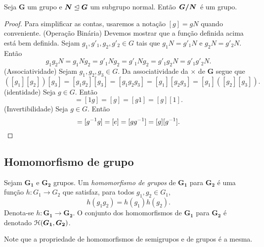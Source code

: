 \begin{proposition}
Seja $\bm G$ um grupo e $\bm N \mathrel{\unlhd} \bm G$ um subgrupo normal. Então $\bm{\quo{G}{N}}$ é um grupo.
\end{proposition}
\begin{proof}
Para simplificar as contas, usaremos a notação $[g]=gN$ quando conveniente.
(Operação Binária) Devemos mostrar que a função definida acima está bem definida. Sejam $g_1,g'_1,g_2,g'_2 \in G$ tais que $g_1N=g'_1N$ e $g_2N=g'_2N$. Então
	\begin{equation*}
	g_1g_2N = g_1Ng_2 = g'_1Ng_2 = g'_1Ng_2 = g'_1g_2N=g'_1g'_2N.
	\end{equation*}
(Associatividade) Sejam $g_1,g_2,g_3 \in G$. Da associatividade da $\times$ de $\bm G$ segue que
	\begin{equation*}
	([g_1][g_2])[g_3] = [g_1g_2][g_3] = [g_1g_2g_3] = [g_1][g_2g_3] = [g_1]([g_2] [g_3]).
	\end{equation*}
(identidade) Seja $g \in G$. Então
	\begin{equation*}
	[1][g] = [1 g] = [g] = [g 1] = [g][1].
	\end{equation*}
(Invertibilidade) Seja $g \in G$. Então
	\begin{equation*}
	[g\inv][g] = [g\inv g] = [e] = [gg\inv] = [g][g\inv].
	\end{equation*}
\end{proof}

\subsection{Homomorfismo de grupo}

\begin{definition}
Sejam $\bm{G_1}$ e $\bm{G_2}$ grupos. Um \emph{homomorfismo de grupos} de $\bm{G_1}$ para $\bm{G_2}$ é uma função $h: G_1 \to G_2$ que satisfaz, para todos $g_1,g_2 \in G_1$,
	\begin{equation*}
	h(g_1g_2)=h(g_1)h(g_2).
	\end{equation*}
Denota-se $h: \bm{G_1} \to \bm{G_2}$. O conjunto dos homomorfismos de $\bm{G_1}$ para $\bm{G_2}$ é denotado $\mathcal{H}(\bm{G_1},\bm{G_2})$.
\end{definition}

Note que a propriedade de homomorfismos de semigrupos e de grupos é a mesma.

